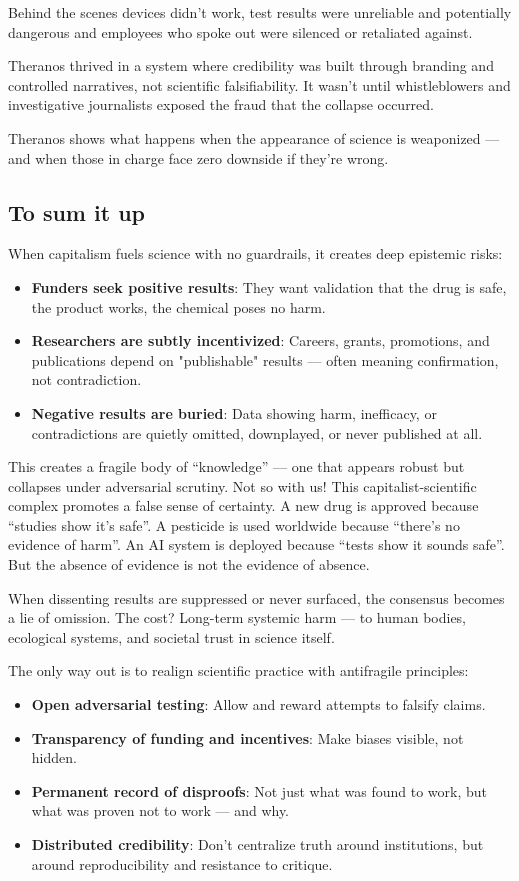 \documentclass{article}
\begin{document}
Behind the scenes devices didn't work, test results were unreliable and potentially dangerous and employees who spoke out were silenced or retaliated against.

Theranos thrived in a system where credibility was built through branding and controlled narratives, not 
scientific falsifiability. It wasn't until whistleblowers and investigative journalists exposed the fraud
that the collapse occurred.

Theranos shows what happens when the appearance of science is weaponized — and when those in charge face
zero downside if they’re wrong.

\cite{USvsHolmes2022}
\cite{buzzfeednews2018}
\cite{justivegove-theranos}

\subsection{To sum it up}

When capitalism fuels science with no guardrails, it creates deep epistemic risks:
\begin{itemize}
	\item \textbf{Funders seek positive results}: They want validation that the drug is safe, the product works, the chemical poses no harm.
	\item \textbf{Researchers are subtly incentivized}: Careers, grants, promotions, and publications depend on "publishable" results — often meaning confirmation, not contradiction.
	\item \textbf{Negative results are buried}: Data showing harm, inefficacy, or contradictions are quietly omitted, downplayed, or never published at all.
\end{itemize}

This creates a fragile body of “knowledge” — one that appears robust but collapses under adversarial scrutiny. Not so with us!  This capitalist-scientific complex promotes a false sense of certainty. A new drug is approved because “studies show it’s safe”. A pesticide is used worldwide because “there’s no evidence of harm”. An AI system is deployed because “tests show it sounds safe”. But the absence of evidence is not the evidence of absence. 

When dissenting results are suppressed or never surfaced, the consensus becomes a lie of omission. The cost? Long-term systemic harm — to human bodies, ecological systems, and societal trust in science itself.

The only way out is to realign scientific practice with antifragile principles:
\begin{itemize}
	\item \textbf{Open adversarial testing}: Allow and reward attempts to falsify claims.
	\item \textbf{Transparency of funding and incentives}: Make biases visible, not hidden.
	\item \textbf{Permanent record of disproofs}: Not just what was found to work, but what was proven not to work — and why.
	\item \textbf{Distributed credibility}: Don’t centralize truth around institutions, but around reproducibility and resistance to critique.
\end{itemize}
\end{document}
